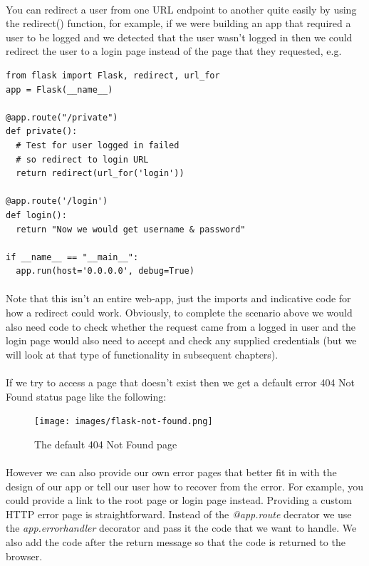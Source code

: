 \documentclass[12pt, a4paper, oneside]{book}
\begin{document}
\paragraph{} You can redirect a user from one URL endpoint to another quite easily by using the redirect() function, for example, if we were building an app that required a user to be logged and we detected that the user wasn't logged in then we could redirect the user to a login page instead of the page that they requested, e.g.

\begin{lstlisting}
from flask import Flask, redirect, url_for
app = Flask(__name__)

@app.route("/private")
def private():
  # Test for user logged in failed
  # so redirect to login URL
  return redirect(url_for('login'))

@app.route('/login')
def login():
  return "Now we would get username & password"

if __name__ == "__main__":
  app.run(host='0.0.0.0', debug=True)
\end{lstlisting}
\paragraph{} Note that this isn't an entire web-app, just the imports and indicative code for how a redirect could work. Obviously, to complete the scenario above we would also need code to check whether the request came from a logged in user and the login page would also need to accept and check any supplied credentials (but we will look at that type of functionality in subsequent chapters). 

\paragraph{} If we try to access a page that doesn't exist then we get a default error 404 Not Found status page like the following:

\begin{figure}[H]
\centering
\texttt{[image: images/flask-not-found.png]}
\caption{The default 404 Not Found page}
\label{fig:flask-not-found}
\end{figure}

\paragraph{} However we can also provide our own error pages that better fit in with the design of our app or tell our user how to recover from the error. For example, you could provide a link to the root page or login page instead. Providing a custom HTTP error page is straightforward. Instead of the \emph{@app.route} decrator we use the \emph{app.errorhandler} decorator and pass it the code that we want to handle. We also add the code after the return message so that the code is returned to the browser.
\end{document}
